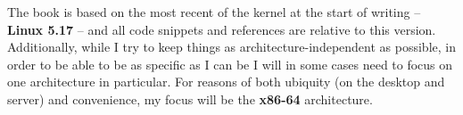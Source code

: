 The book is based on the most recent of the kernel at the start of writing --
\textbf{Linux 5.17} -- and all code snippets and references are relative to this
version. Additionally, while I try to keep things as architecture-independent as
possible, in order to be able to be as specific as I can be I will in some cases
need to focus on one architecture in particular. For reasons of both ubiquity
(on the desktop and server) and convenience, my focus will be the
\textbf{x86-64} architecture.\\
